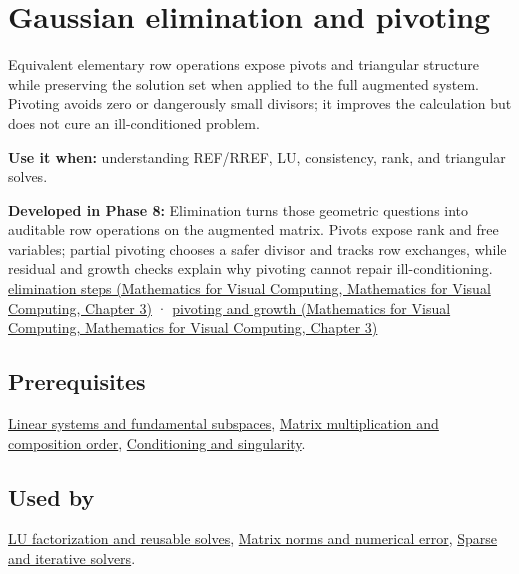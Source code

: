 \hypertarget{appendix-f6e77f4a200f}{}\label{referencestart:appendix-f6e77f4a200f}
\section{Gaussian elimination and pivoting}\label{appendix-f6e77f4a200f-gaussian-elimination-and-pivoting}

Equivalent elementary row operations expose pivots and triangular structure while preserving the solution set when applied to the full augmented system. Pivoting avoids zero or dangerously small divisors; it improves the calculation but does not cure an ill-conditioned problem.

\textbf{Use it when:} understanding REF/RREF, LU, consistency, rank, and triangular solves.

\textbf{Developed in Phase 8:} Elimination turns those geometric questions into auditable row operations on the augmented matrix. Pivots expose rank and free variables; partial pivoting chooses a safer divisor and tracks row exchanges, while residual and growth checks explain why pivoting cannot repair ill-conditioning. \href{../02-Mathematics-for-Visual-Computing/main.pdf\#nameddest=01-foundations-i-ch019-elimination-turns-the-geometry-into-an-auditable-calculation}{elimination steps (Mathematics for Visual Computing, Mathematics for Visual Computing, Chapter 3)} · \href{../02-Mathematics-for-Visual-Computing/main.pdf\#nameddest=01-foundations-i-ch019-pivoting-separates-algorithm-failure-from-matrix-failure}{pivoting and growth (Mathematics for Visual Computing, Mathematics for Visual Computing, Chapter 3)}

\subsection{Prerequisites}\label{appendix-f6e77f4a200f-prerequisites}

\hyperref[appendix-8572a4a060c1]{Linear systems and fundamental subspaces}, \hyperref[appendix-ab31ef447dbf]{Matrix multiplication and composition order}, \hyperref[appendix-8f6a01f284a7]{Conditioning and singularity}.

\subsection{Used by}\label{appendix-f6e77f4a200f-used-by}

\hyperref[appendix-55e4b5b0a1e6]{LU factorization and reusable solves}, \hyperref[appendix-f8657bac66e5]{Matrix norms and numerical error}, \hyperref[appendix-67c87a3d9e94]{Sparse and iterative solvers}.

